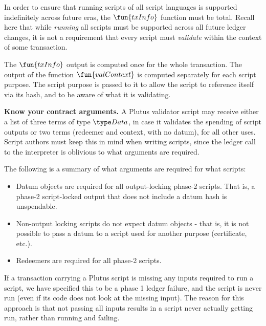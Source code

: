   In order to ensure that running scripts of all script languages is supported indefinitely across
  future eras, the $\fun{txInfo}$ function must be total.
  Recall here that while \emph{running} all scripts must be supported across
  all future ledger changes,
  it is not a requirement that every script must \emph{validate} within the context of some transaction.

  The $\fun{txInfo}$ output is computed once for the whole transaction. The output of the function
  $\fun{valContext}$ is computed separately for each script purpose.
  The script purpose is passed to it
  to allow the script to reference itself via its hash, and to be aware of what it is validating.

\textbf{Know your contract arguments.}
  A Plutus validator script may receive either a list of three terms of type $\Data$, in case it validates the spending of script outputs
  or two terms (redeemer and context, with no datum), for all other uses.
  Script authors must keep this in mind when writing scripts, since the ledger call to the interpreter is oblivious to what
  arguments are required.

  The following is a summary of what arguments are required for what scripts:
  \begin{itemize}
    \item Datum objects are required for all output-locking phase-2 scripts. That is, a
    phase-2 script-locked output that does not include a datum hash is unspendable.
    \item Non-output locking scripts do not expect datum objects - that is, it is not possible to pass
    a datum to a script used for another purpose (certificate, etc.).
    \item Redeemers are required for all phase-2 scripts.
  \end{itemize}

   If a transaction carrying a Plutus script is missing any inputs required
   to run a script, we have specified this to be a phase 1
   ledger failure, and the script is never run (even if its code does not look at
   the missing input). The reason for this approach is that
   not passing all inputs results in a script never actually getting run,
   rather than running and failing.

